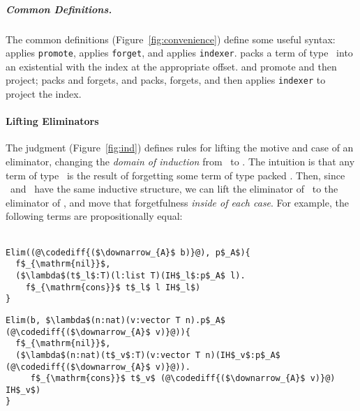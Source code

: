 \subparagraph*{Common Definitions.} The common definitions (Figure~\ref{fig:convenience}) %
define some useful syntax:
\smallmath{$\uparrow$} applies \lstinline{promote}, \smallmath{$\downarrow$} applies
\lstinline{forget}, and  applies \lstinline{indexer}.
 packs a term of type \B\
into an existential with the index at the appropriate offset.  and  promote and then project;
\smallmath{$\downarrow_{A}$} packs and forgets, and \smallmath{$\downarrow_{I_B}$} packs, forgets, and then 
applies \lstinline{indexer} to project the index.

\paragraph{Lifting Eliminators}

The  judgment (Figure~\ref{fig:ind}) defines rules for lifting the motive and case of an
eliminator, changing the \textit{domain of induction} from \Aa\ to \B.
The intuition is that any term of type \Aa\ is the result of forgetting some term of type packed \B.
Then, since \Aa\ and \B\ have the same inductive structure, we can lift the eliminator of \Aa\ to the eliminator of \B,
and move that forgetfulness \textit{inside of each case}.
For example,
the following terms are propositionally equal:\vspace{-0.2cm}\\\\
\begin{minipage}{0.39\textwidth}
\begin{lstlisting}
Elim((@\codediff{($\downarrow_{A}$ b)}@), p$_A$){
  f$_{\mathrm{nil}}$,
  ($\lambda$(t$_l$:T)(l:list T)(IH$_l$:p$_A$ l).
    f$_{\mathrm{cons}}$ t$_l$ l IH$_l$)
}
\end{lstlisting}
\end{minipage}
\hspace{-0.2cm}
\begin{minipage}{0.61\textwidth}
\begin{lstlisting}
Elim(b, $\lambda$(n:nat)(v:vector T n).p$_A$ (@\codediff{($\downarrow_{A}$ v)}@)){
  f$_{\mathrm{nil}}$,
  ($\lambda$(n:nat)(t$_v$:T)(v:vector T n)(IH$_v$:p$_A$ (@\codediff{($\downarrow_{A}$ v)}@)).
     f$_{\mathrm{cons}}$ t$_v$ (@\codediff{($\downarrow_{A}$ v)}@) IH$_v$)
}
\end{lstlisting}
\end{minipage}

